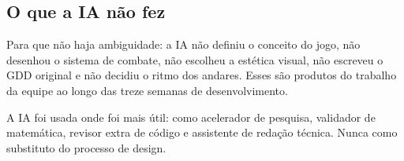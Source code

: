 \subsection{O que a IA não fez}

Para que não haja ambiguidade: a IA não definiu o conceito do jogo, não desenhou
o sistema de combate, não escolheu a estética visual, não escreveu o GDD
original e não decidiu o ritmo dos andares. Esses são produtos do trabalho da
equipe ao longo das treze semanas de desenvolvimento.

A IA foi usada onde foi mais útil: como acelerador de pesquisa, validador de
matemática, revisor extra de código e assistente de redação técnica. Nunca como
substituto do processo de design.
